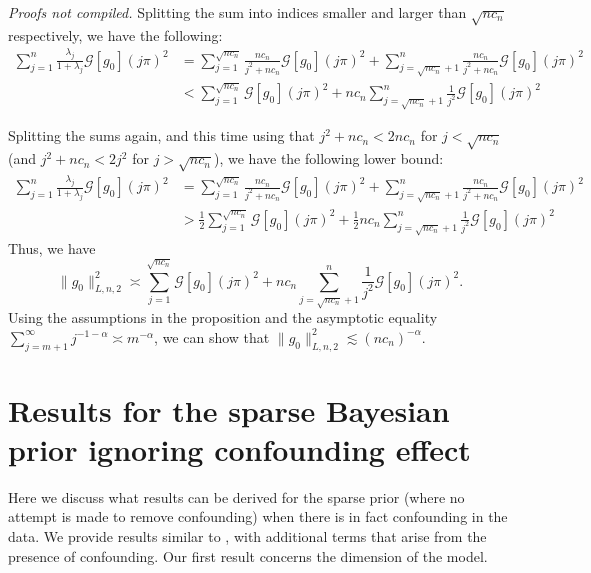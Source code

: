 \documentclass[11pt]{article}
\renewenvironment{proof}[1]{\par\noindent{\bf #1 \ }}{\hfill\BlackBox\\[2mm]}
\renewenvironment{proof}[1]{\textit{Proofs not compiled.}}{}
\numberwithin{equation}{section}
\begin{document}
\begin{proof}{Proof of Proposition \ref{prop:g0_control_FDBM}}
Splitting the sum into indices smaller and larger than $\sqrt{nc_n}$ respectively, we have the following:
\begin{align*}
	\sum_{j = 1}^n\frac{\lambda_j}{1+\lambda_j} \mathcal{G}[g_0](j \pi)^2 &= \sum_{j = 1}^{\sqrt{nc_n}} \frac{n c_n}{j^2 + nc_n} \mathcal{G}[g_0](j \pi)^2 + \sum_{j = \sqrt{nc_n} + 1}^{n} \frac{n c_n}{j^2 + nc_n} \mathcal{G}[g_0](j \pi)^2\\
&< \sum_{j = 1}^{\sqrt{nc_n}}  \mathcal{G}[g_0](j \pi)^2 + n c_n \sum_{j = \sqrt{nc_n} + 1}^{n} \frac{1}{j^2 } \mathcal{G}[g_0](j \pi)^2
\end{align*}

Splitting the sums again, and this time using that $j^2 + nc_n < 2nc_n$ for $j < \sqrt{nc_n}$ (and $j^2 + nc_n < 2j^2$ for $j > \sqrt{nc_n}$), we have the following lower bound:
\begin{align*}
	\sum_{j = 1}^n\frac{\lambda_j}{1+\lambda_j} \mathcal{G}[g_0](j \pi)^2 &= \sum_{j = 1}^{\sqrt{nc_n}} \frac{n c_n}{j^2 + nc_n} \mathcal{G}[g_0](j \pi)^2 + \sum_{j = \sqrt{nc_n} + 1}^{n} \frac{n c_n}{j^2 + nc_n} \mathcal{G}[g_0](j \pi)^2\\
&> \frac{1}{2} \sum_{j = 1}^{\sqrt{nc_n}}  \mathcal{G}[g_0](j \pi)^2 + \frac{1}{2} n c_n \sum_{j = \sqrt{nc_n} + 1}^{n} \frac{1}{j^2 } \mathcal{G}[g_0](j \pi)^2
\end{align*}
Thus, we have
$$
\|g_0\|_{L, n, 2}^2 \asymp \sum_{j = 1}^{\sqrt{nc_n}}  \mathcal{G}[g_0](j \pi)^2 + n c_n \sum_{j = \sqrt{nc_n} + 1}^{n} \frac{1}{j^2 } \mathcal{G}[g_0](j \pi)^2.
$$
Using the assumptions in the proposition and the asymptotic equality $\sum_{j = m + 1}^\infty j^{-1-\alpha} \asymp m^{-\alpha}$, we can show that $\|g_0\|_{L, n, 2}^2 \lesssim (nc_n)^{-\alpha}$.	
\end{proof}

\section{Results for the sparse Bayesian prior ignoring confounding effect}
Here we discuss what results can be derived for the sparse prior (where no attempt is made to remove confounding) when there is in fact confounding in the data. We provide results similar to \cite{CS-HV2015}, with additional terms that arise from the presence of confounding. Our first result concerns the dimension of the model.
\end{document}
